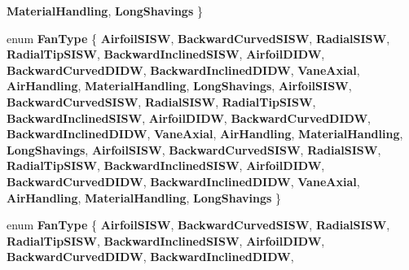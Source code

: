 \begin{DoxyCompactItemize}
{\bfseries Material\+Handling}, 
{\bfseries Long\+Shavings}
 \}
\item 
\mbox{\label{class_optimal_fan_efficiency_a468d7943ddcfc8678373762cd0641823}} 
enum {\bfseries Fan\+Type} \{ \newline
{\bfseries Airfoil\+S\+I\+SW}, 
{\bfseries Backward\+Curved\+S\+I\+SW}, 
{\bfseries Radial\+S\+I\+SW}, 
{\bfseries Radial\+Tip\+S\+I\+SW}, 
\newline
{\bfseries Backward\+Inclined\+S\+I\+SW}, 
{\bfseries Airfoil\+D\+I\+DW}, 
{\bfseries Backward\+Curved\+D\+I\+DW}, 
{\bfseries Backward\+Inclined\+D\+I\+DW}, 
\newline
{\bfseries Vane\+Axial}, 
{\bfseries Air\+Handling}, 
{\bfseries Material\+Handling}, 
{\bfseries Long\+Shavings}, 
\newline
{\bfseries Airfoil\+S\+I\+SW}, 
{\bfseries Backward\+Curved\+S\+I\+SW}, 
{\bfseries Radial\+S\+I\+SW}, 
{\bfseries Radial\+Tip\+S\+I\+SW}, 
\newline
{\bfseries Backward\+Inclined\+S\+I\+SW}, 
{\bfseries Airfoil\+D\+I\+DW}, 
{\bfseries Backward\+Curved\+D\+I\+DW}, 
{\bfseries Backward\+Inclined\+D\+I\+DW}, 
\newline
{\bfseries Vane\+Axial}, 
{\bfseries Air\+Handling}, 
{\bfseries Material\+Handling}, 
{\bfseries Long\+Shavings}, 
\newline
{\bfseries Airfoil\+S\+I\+SW}, 
{\bfseries Backward\+Curved\+S\+I\+SW}, 
{\bfseries Radial\+S\+I\+SW}, 
{\bfseries Radial\+Tip\+S\+I\+SW}, 
\newline
{\bfseries Backward\+Inclined\+S\+I\+SW}, 
{\bfseries Airfoil\+D\+I\+DW}, 
{\bfseries Backward\+Curved\+D\+I\+DW}, 
{\bfseries Backward\+Inclined\+D\+I\+DW}, 
\newline
{\bfseries Vane\+Axial}, 
{\bfseries Air\+Handling}, 
{\bfseries Material\+Handling}, 
{\bfseries Long\+Shavings}
 \}
\item 
\mbox{\label{class_optimal_fan_efficiency_a468d7943ddcfc8678373762cd0641823}} 
enum {\bfseries Fan\+Type} \{ \newline
{\bfseries Airfoil\+S\+I\+SW}, 
{\bfseries Backward\+Curved\+S\+I\+SW}, 
{\bfseries Radial\+S\+I\+SW}, 
{\bfseries Radial\+Tip\+S\+I\+SW}, 
\newline
{\bfseries Backward\+Inclined\+S\+I\+SW}, 
{\bfseries Airfoil\+D\+I\+DW}, 
{\bfseries Backward\+Curved\+D\+I\+DW}, 
{\bfseries Backward\+Inclined\+D\+I\+DW}, 

\end{DoxyCompactItemize}
